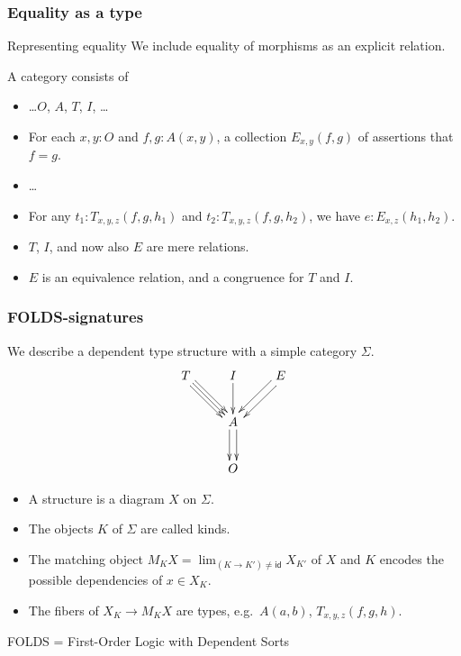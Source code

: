 \documentclass{beamer}
\begin{document}
\begin{frame}[t]
  \frametitle{Equality as a type}
  \begin{block}{Representing equality}
    We include \alert{equality of morphisms} as an explicit relation.
  \end{block}
  A category consists of
  \begin{itemize}
  \item \dots $O$, $A$, $T$, $I$, \dots
  \item For each $x,y:O$ and $f,g:A(x,y)$, a collection $E_{x,y}(f,g)$ of \alert{assertions that $f=g$}.
  \item \dots
    \pause
  \item For any $t_1:T_{x,y,z}(f,g,h_1)$ and $t_2:T_{x,y,z}(f,g,h_2)$, we have $e : E_{x,z}(h_1,h_2)$.
  \item $T$, $I$, and now also $E$ are mere relations.
  \item $E$ is an equivalence relation, and a congruence for $T$ and $I$.
  \end{itemize}
\end{frame}

\begin{frame}
  \frametitle{FOLDS-signatures}
  We describe a dependent type structure with a \alert<1>{simple category} $\Sigma$.
  \[
  \vcenter{\xymatrix{
      T \ar[dr] \ar@<1mm>[dr] \ar@<-1mm>[dr] & I \ar[d] & E \ar@<1mm>[dl] \ar@<-1mm>[dl] \\
      & A \ar@<1mm>[d] \ar@<-1mm>[d] \\
      & O}}
  \]
  \pause
  \begin{itemize}
  \item A \alert<2>{structure} is a {diagram} $X$ on $\Sigma$.
  \item The objects $K$ of $\Sigma$ are called \alert<2>{kinds}.
  \item The \alert<2>{matching object} $M_K X = \lim_{(K\to K') \neq \mathsf{id}} X_{K'}$ of $X$ and $K$ encodes the possible dependencies of $x\in X_K$.
  \item The fibers of $X_K\to M_K X$ are \alert<2>{types}, e.g.\ $A(a,b)$, $T_{x,y,z}(f,g,h)$.
  \end{itemize}
  \pause
  \alert{FOLDS} = \alert{F}irst-\alert{O}rder \alert{L}ogic with \alert{D}ependent \alert{S}orts
\end{frame}
\end{document}
